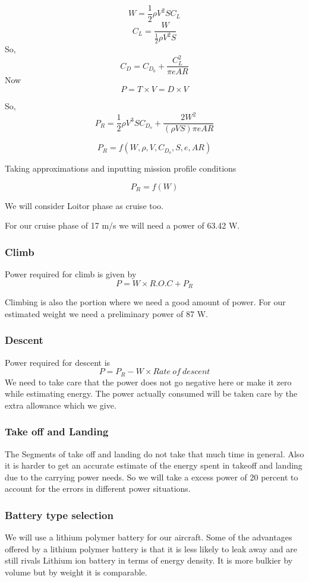 \documentclass[12 pt]{article}
\begin{document}
$$ W = \frac{1}{2} \rho V^2 S C_L $$
$$ C_L = \frac{W}{\frac{1}{2} \rho V^2 S}$$
So,
$$ C_D = C_{D_0} + \frac{C_L^2}{\pi e AR} $$
Now 
$$ P = T\times V = D\times V $$

So, 
$$ P_R = \frac{1}{2}\rho V^3 S C_{D_o} + \frac{2 W^2}{ (\rho V S) \pi e AR} $$

$$P_R = f(W,\rho,V,C_{D_o},S,e,AR)$$

Taking approximations and inputting mission profile conditions

$$ P_R = f(W) $$

We will consider Loitor phase as cruise too.

For our cruise phase of 17 m/s we will need a power of 63.42 W.

\subsubsection{Climb }
Power required for climb is given by 
$$ P = W \times R.O.C + P_R $$

Climbing is also the portion where we need a good amount of power. For our estimated weight we need a preliminary power of 87 W.

\subsubsection{Descent}
Power required for descent is 
$$ P = P_R - W \times Rate\: of\: descent$$
We need to take care that the power does not go negative here or make it zero while estimating energy. The power actually consumed will be taken care by the extra allowance which we give.

\subsubsection{Take off and Landing}
The Segments of take off and landing do not take that much time in general. Also it is harder to get an accurate estimate of the energy spent in takeoff and landing due to the carrying power needs. So we will take a excess power of 20 percent to account for the errors in different power situations.

\subsubsection{Battery type selection \cite{Lipobattery}}

We will use a lithium polymer battery for our aircraft. Some of the advantages offered by a lithium polymer battery is that it is less likely to leak away and are still rivals Lithium ion battery in terms of energy density. It is more bulkier by volume but by weight it is comparable.
\end{document}
